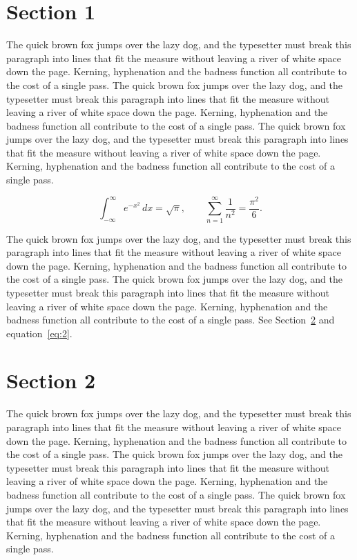 \documentclass{article}
\begin{document}
\tableofcontents
\section{Section 1}
\label{sec:1}
The quick brown fox jumps over the lazy dog, and the typesetter must break this paragraph into lines that fit the measure without leaving a river of white space down the page. Kerning, hyphenation and the badness function all contribute to the cost of a single pass. The quick brown fox jumps over the lazy dog, and the typesetter must break this paragraph into lines that fit the measure without leaving a river of white space down the page. Kerning, hyphenation and the badness function all contribute to the cost of a single pass. The quick brown fox jumps over the lazy dog, and the typesetter must break this paragraph into lines that fit the measure without leaving a river of white space down the page. Kerning, hyphenation and the badness function all contribute to the cost of a single pass. 

\begin{equation}\label{eq:1}
\int_{-\infty}^{\infty} e^{-x^{2}}\,dx = \sqrt{\pi}, \qquad
\sum_{n=1}^{\infty} \frac{1}{n^{2}} = \frac{\pi^{2}}{6}.
\end{equation}

The quick brown fox jumps over the lazy dog, and the typesetter must break this paragraph into lines that fit the measure without leaving a river of white space down the page. Kerning, hyphenation and the badness function all contribute to the cost of a single pass. The quick brown fox jumps over the lazy dog, and the typesetter must break this paragraph into lines that fit the measure without leaving a river of white space down the page. Kerning, hyphenation and the badness function all contribute to the cost of a single pass. 
See Section~\ref{sec:2} and equation~\eqref{eq:2}.
\section{Section 2}
\label{sec:2}
The quick brown fox jumps over the lazy dog, and the typesetter must break this paragraph into lines that fit the measure without leaving a river of white space down the page. Kerning, hyphenation and the badness function all contribute to the cost of a single pass. The quick brown fox jumps over the lazy dog, and the typesetter must break this paragraph into lines that fit the measure without leaving a river of white space down the page. Kerning, hyphenation and the badness function all contribute to the cost of a single pass. The quick brown fox jumps over the lazy dog, and the typesetter must break this paragraph into lines that fit the measure without leaving a river of white space down the page. Kerning, hyphenation and the badness function all contribute to the cost of a single pass. 
\end{document}
